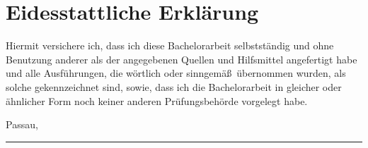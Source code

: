 


\chapter{Eidesstattliche Erkl\"arung}



	Hiermit versichere ich, dass ich diese Bachelorarbeit selbstständig und ohne Benutzung anderer als der angegebenen Quellen und Hilfsmittel angefertigt habe und alle Ausführungen, die wörtlich oder sinngemä\ss ~übernommen wurden, als solche gekennzeichnet sind, sowie, dass ich die Bachelorarbeit in gleicher oder ähnlicher Form noch keiner anderen Prüfungsbehörde vorgelegt habe.



	\vspace{3cm}



	Passau, \thedate



	\vspace{2cm}



	\parbox{8cm}{

		\hrule \strut \theauthor

	}

